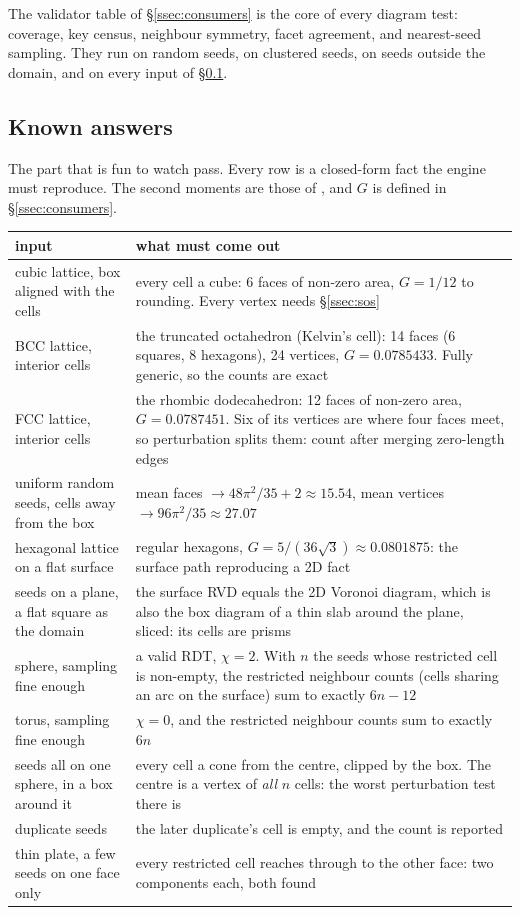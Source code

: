 \documentclass[11pt,a4paper]{article}
\newcommand{\secref}[1]{\S\ref{#1}}
\begin{document}
The validator table of \secref{ssec:consumers} is the core of every diagram test: coverage, key
census, neighbour symmetry, facet agreement, and nearest-seed sampling. They run on random seeds,
on clustered seeds, on seeds outside the domain, and on every input of \secref{ssec:known}.

\subsection{Known answers}\label{ssec:known}

The part that is fun to watch pass. Every row is a closed-form fact the engine must reproduce.
The second moments are those of \citet{conway1999}, and $G$ is defined in
\secref{ssec:consumers}.

{\small
\begin{xltabular}{\linewidth}{@{}P{4.4cm} L@{}}
\toprule
input & what must come out \\
\midrule
\endhead
cubic lattice, box aligned with the cells
  & every cell a cube: 6 faces of non-zero area, $G = 1/12$ to rounding. Every vertex needs
    \secref{ssec:sos} \\
BCC lattice, interior cells
  & the truncated octahedron (Kelvin's cell): 14 faces (6 squares, 8 hexagons), 24 vertices,
    $G = 0.0785433$. Fully generic, so the counts are exact \\
FCC lattice, interior cells
  & the rhombic dodecahedron: 12 faces of non-zero area, $G = 0.0787451$. Six of its vertices
    are where four faces meet, so perturbation splits them: count after merging zero-length
    edges \\
uniform random seeds, cells away from the box
  & mean faces $\to 48\pi^2/35 + 2 \approx 15.54$, mean vertices $\to 96\pi^2/35 \approx 27.07$
    \citep{meijering1953} \\
hexagonal lattice on a flat surface
  & regular hexagons, $G = 5/(36\sqrt{3}) \approx 0.0801875$: the surface path reproducing a 2D
    fact \\
seeds on a plane, a flat square as the domain
  & the surface RVD equals the 2D Voronoi diagram, which is also the box diagram of a thin slab
    around the plane, sliced: its cells are prisms \\
sphere, sampling fine enough
  & a valid RDT, $\chi = 2$. With $n$ the seeds whose restricted cell is non-empty, the
    restricted neighbour counts (cells sharing an arc on the surface) sum to exactly $6n - 12$ \\
torus, sampling fine enough
  & $\chi = 0$, and the restricted neighbour counts sum to exactly $6n$ \\
seeds all on one sphere, in a box around it
  & every cell a cone from the centre, clipped by the box. The centre is a vertex of \emph{all}
    $n$ cells: the worst perturbation test there is \\
duplicate seeds
  & the later duplicate's cell is empty, and the count is reported \\
thin plate, a few seeds on one face only
  & every restricted cell reaches through to the other face: two components each, both
    found \\
\bottomrule
\end{xltabular}}
\end{document}
